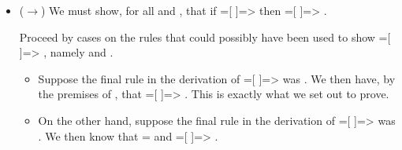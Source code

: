 \documentclass[12pt]{report}
\begin{document}
\begin{itemize}
\item  (\ensuremath{\rightarrow}) We must show, for all  and , that if  =[
              ]=>  then  =[  ]=> .


       Proceed by cases on the rules that could possibly have been
       used to show  =[        ]=> , namely
        and .



\begin{itemize}
\item  Suppose the final rule in the derivation of  =[  
              ]=>  was .  We then have,
         by the premises of , that  =[  ]=> .
         This is exactly what we set out to prove.



\item  On the other hand, suppose the final rule in the derivation
         of  =[        ]=>  was .
         We then know that    =  and  =[  ]=> .



\end{itemize}
\end{itemize}
\end{document}
